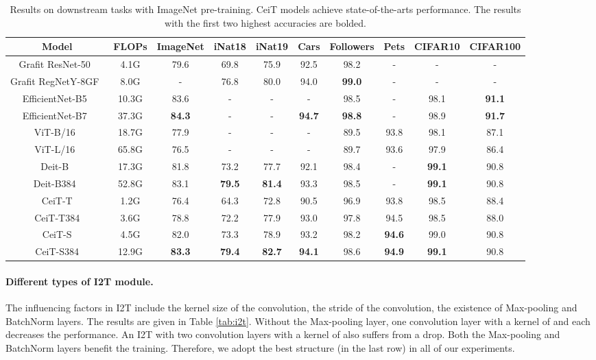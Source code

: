 \documentclass[10pt,twocolumn,letterpaper]{article}
\begin{document}
\begin{table*}[t]
   \centering
   \footnotesize
   \caption{Results on downstream tasks with ImageNet pre-training. CeiT models achieve state-of-the-arts performance. The results with the first two highest accuracies are bolded.}
   \begin{tabular}{c|c|cccccccc}
       \toprule
       Model & FLOPs & ImageNet & iNat18 & iNat19 & Cars & Followers & Pets & CIFAR10 & CIFAR100 \\
       \midrule
       Grafit ResNet-50~\cite{touvron2020grafit} & 4.1G & 79.6 & 69.8 & 75.9 & 92.5 & 98.2 & - & - & - \\
       Grafit RegNetY-8GF~\cite{touvron2020grafit}  & 8.0G & - & 76.8 & 80.0 & 94.0 & \textbf{99.0} & - & - & - \\
       EfficientNet-B5~\cite{DBLP:conf/icml/TanL19} & 10.3G & 83.6 & - & - & - & 98.5 & - & 98.1 & \textbf{91.1} \\
       EfficientNet-B7~\cite{DBLP:conf/icml/TanL19} & 37.3G & \textbf{84.3} & - & - & \textbf{94.7} & \textbf{98.8} & - & 98.9 & \textbf{91.7} \\
       \midrule
       ViT-B/16~\cite{dosovitskiy2021an} & 18.7G & 77.9 & - & - & - & 89.5 & 93.8 & 98.1 & 87.1 \\
       ViT-L/16~\cite{dosovitskiy2021an} & 65.8G & 76.5 & - & - & - & 89.7 & 93.6 & 97.9 & 86.4 \\
       \midrule
       Deit-B~\cite{DBLP:journals/corr/abs-2012-12877} & 17.3G & 81.8 & 73.2 & 77.7 & 92.1 & 98.4 & - & \textbf{99.1} & 90.8 \\
       Deit-B384~\cite{DBLP:journals/corr/abs-2012-12877} & 52.8G & 83.1 & \textbf{79.5} & \textbf{81.4} & 93.3 & 98.5 & - & \textbf{99.1} & 90.8 \\
       \midrule
        CeiT-T & 1.2G & 76.4 & 64.3 & 72.8 & 90.5 & 96.9 & 93.8 & 98.5 & 88.4 \\
        CeiT-T384 & 3.6G & 78.8 & 72.2 & 77.9 & 93.0& 97.8 & 94.5 & 98.5 & 88.0\\ 
        CeiT-S & 4.5G & 82.0 & 73.3 & 78.9 & 93.2 & 98.2 & \textbf{94.6} & 99.0 & 90.8 \\
        CeiT-S384 & 12.9G & \textbf{83.3} & \textbf{79.4} & \textbf{82.7} & \textbf{94.1} & 98.6 & \textbf{94.9} & \textbf{99.1} & 90.8 \\
       \bottomrule
   \end{tabular}
   \label{tab:transfer}
\end{table*}

\paragraph{Different types of I2T module.} The influencing factors in I2T include the kernel size of the convolution, the stride of the convolution, the existence of Max-pooling and BatchNorm layers. The results are given in Table \ref{tab:i2t}.  Without the Max-pooling layer, one convolution layer with a kernel of  and  each decreases the performance. An I2T with two convolution layers with a kernel of  also suffers from a drop. Both the Max-pooling and BatchNorm layers benefit the training. Therefore, we adopt the best structure (in the last row) in all of our experiments.
\end{document}
